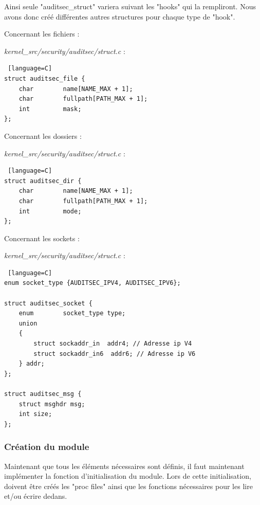 \documentclass[pdftex,a4paper,titlepage,11pt]{article}
\begin{document}
Ainsi seule "auditsec\_struct" variera suivant les "hooks" qui la rempliront. Nous avons donc créé différentes autres structures pour chaque type de "hook".

Concernant les fichiers :

\textit{{kernel\_src}/security/auditsec/struct.c} :
\begin{lstlisting} [language=C]
struct auditsec_file {
    char        name[NAME_MAX + 1];
    char        fullpath[PATH_MAX + 1];
    int         mask;
};
\end{lstlisting} 

Concernant les dossiers : 

\textit{{kernel\_src}/security/auditsec/struct.c} :
\begin{lstlisting} [language=C]
struct auditsec_dir {
    char        name[NAME_MAX + 1];
    char        fullpath[PATH_MAX + 1];
    int         mode;
};
\end{lstlisting} 

Concernant les sockets : 

\textit{{kernel\_src}/security/auditsec/struct.c} :
\begin{lstlisting} [language=C]
enum socket_type {AUDITSEC_IPV4, AUDITSEC_IPV6};

struct auditsec_socket {
    enum        socket_type type;
    union
    {
        struct sockaddr_in  addr4; // Adresse ip V4
        struct sockaddr_in6  addr6; // Adresse ip V6
    } addr;
};

struct auditsec_msg {
    struct msghdr msg;
    int size;
};
\end{lstlisting} 

\subsubsection{Création du module}

Maintenant que tous les éléments nécessaires sont définis, il faut maintenant implémenter la fonction d'initialisation du module. Lors de cette initialisation, doivent être créés les "proc files" ainsi que les fonctions nécessaires pour les lire et/ou écrire dedans.
\end{document}
